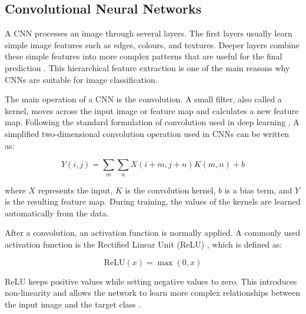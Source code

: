 \subsection{Convolutional Neural Networks}

{\color{blue}  
A CNN processes an image through several layers. The first layers usually learn simple image features such as edges, colours, and textures. Deeper layers combine these simple features into more complex patterns that are useful for the final prediction \cite{Goodfellow-et-al-2016}. This hierarchical feature extraction is one of the main reasons why CNNs are suitable for image classification.

The main operation of a CNN is the convolution. A small filter, also called a kernel, moves across the input image or feature map and calculates a new feature map. Following the standard formulation of convolution used in deep learning \cite{Goodfellow-et-al-2016}, A simplified two-dimensional convolution operation used in CNNs can be written as:

\begin{equation}
Y(i,j) =
\sum_{m}\sum_{n}
X(i+m,j+n)K(m,n) + b
\label{eq:convolution}
\end{equation}

where $X$ represents the input, $K$ is the convolution kernel, $b$ is a bias term, and $Y$ is the resulting feature map. During training, the values of the kernels are learned automatically from the data.


After a convolution, an activation function is normally applied. A commonly used activation function is the Rectified Linear Unit (ReLU) \cite{Goodfellow-et-al-2016}, which is defined as:

\begin{equation}
\mathrm{ReLU}(x) = \max(0,x)
\label{eq:relu}
\end{equation}


ReLU keeps positive values while setting negative values to zero. This introduces non-linearity and allows the network to learn more complex relationships between the input image and the target class \cite{Goodfellow-et-al-2016}.
}

